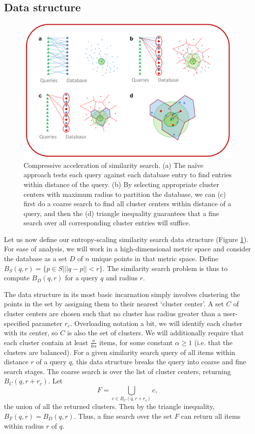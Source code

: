 \documentclass{amsbook}
\theoremstyle{definition}
\theoremstyle{remark}
\numberwithin{equation}{section}
\begin{document}
\subsection{Data structure}
\begin{figure}[btp]
    \centering
    \includegraphics[width=1\textwidth]{dataStructure}
    \caption{ Compressive acceleration of similarity search. %
            (a) The naïve approach tests each query against each database entry to find entries within distance  of the query. %
            (b) By selecting appropriate cluster centers with maximum radius  to partition the database, we can (c) first do a coarse search to find all cluster centers within distance  of a query, and then the (d) triangle inequality guarantees that a fine search over all corresponding cluster entries will suffice.}
    \label{fig:dataStructure}
\end{figure}

Let us now define our entropy-scaling similarity search data structure (Figure \ref{fig:dataStructure}).
For ease of analysis, we will work in a high-dimensional metric space and consider the database as a set $D$ of $n$ unique points in that metric space.
Define $B_S(q,r) = \{ p \in S | ||q-p||<r \}$. The similarity search problem is thus to compute $B_D(q,r)$ for a query $q$ and radius $r$.

The data structure in its most basic incarnation simply involves clustering the points in the set by assigning them to their nearest `cluster center'.
A set $C$ of cluster centers are chosen such that no cluster has radius greater than a user-specified parameter $r_c$.
Overloading notation a bit, we will identify each cluster with its center, so $C$ is also the set of clusters.
We will additionally require that each cluster contain at least $\frac{n}{k \alpha}$ items, for some constant $\alpha \ge 1$ (i.e. that the clusters are balanced).
For a given similarity search query of all items within distance $r$ of a query $q$, this data structure breaks the query into coarse and fine search stages.
The coarse search is over the list of cluster centers, returning $B_C(q,r + r_c)$.
Let \[\displaystyle F = \bigcup_{c \in B_C(q,r+r_c)} c , \] the union of all the returned clusters.
Then by the triangle inequality, $B_F(q,r) = B_D(q,r)$.
Thus, a fine search over the set $F$ can return all items within radius $r$ of $q$.
\end{document}
